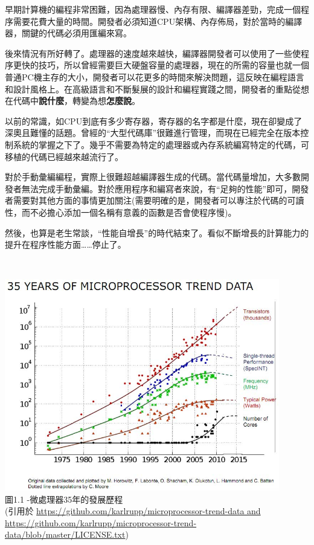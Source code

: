 
早期計算機的編程非常困難，因為處理器慢、內存有限、編譯器差勁，完成一個程序需要花費大量的時間。開發者必須知道CPU架構、內存佈局，對於當時的編譯器，關鍵的代碼必須用匯編來寫。

後來情況有所好轉了。處理器的速度越來越快，編譯器開發者可以使用了一些使程序更快的技巧，所以曾經需要巨大硬盤容量的處理器，現在的所需的容量也就一個普通PC機主存的大小，開發者可以花更多的時間來解決問題，這反映在編程語言和設計風格上。在高級語言和不斷髮展的設計和編程實踐之間，開發者的重點從想在代碼中\textbf{說什麼}，轉變為想\textbf{怎麼說}。

以前的常識，如CPU到底有多少寄存器，寄存器的名字都是什麼，現在卻變成了深奧且難懂的話題。曾經的“大型代碼庫”很難進行管理，而現在已經完全在版本控制系統的掌握之下了。幾乎不需要為特定的處理器或內存系統編寫特定的代碼，可移植的代碼已經越來越流行了。

對於手動彙編編程，實際上很難超越編譯器生成的代碼。當代碼量增加，大多數開發者無法完成手動彙編。對於應用程序和編寫者來說，有“足夠的性能”即可，開發者需要對其他方面的事情更加關注(需要明確的是，開發者可以專注於代碼的可讀性，而不必擔心添加一個名稱有意義的函數是否會使程序慢)。

然後，也算是老生常談，“性能自增長”的時代結束了。看似不斷增長的計算能力的提升在程序性能方面……停止了。


\hspace*{\fill} \\ %
\begin{center}
\includegraphics[width=0.9\textwidth]{content/1/chapter1/images/1.jpg}\\
圖1.1 -微處理器35年的發展歷程 \\
(引用於 \url{https://github.com/karlrupp/microprocessor-trend-data and https://github.com/karlrupp/microprocessor-trend-data/blob/master/LICENSE.txt})
\end{center}

